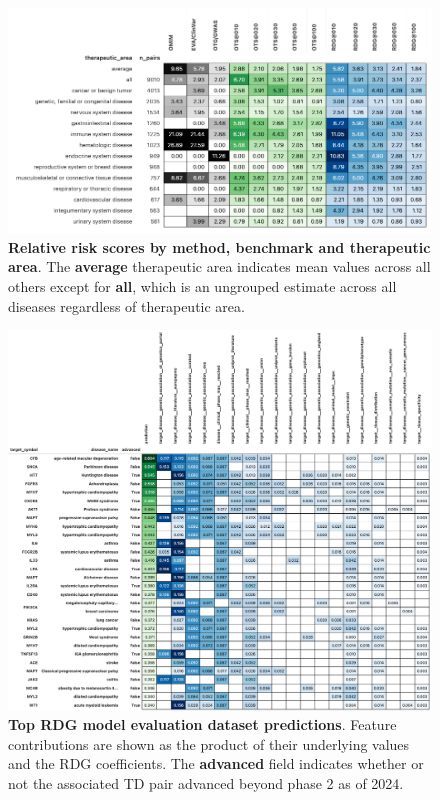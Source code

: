 \documentclass{article}
\begin{document}
\begin{figure}
  \centering
  \captionsetup{width=.9\linewidth}
  \includegraphics[width=1\textwidth]{relative_risk_by_ta.png}
  \caption{
    \textbf{Relative risk scores by method, benchmark and therapeutic area}.
    The \textbf{average} therapeutic area indicates mean values across all others except for \textbf{all}, which is an ungrouped estimate across all diseases regardless of therapeutic area.
  }
  \label{fig:relative_risk_by_ta}
\end{figure}


\begin{figure}
  \centering
  \captionsetup{width=.9\linewidth}
  \includegraphics[width=1\textwidth]{top_evaluation_predictions.png}
  \caption{
    \textbf{Top RDG model evaluation dataset predictions}.
    Feature contributions are shown as the product of their underlying values and the RDG coefficients. The \textbf{advanced} field indicates whether or not the associated TD pair advanced beyond phase 2 as of 2024.
  }
  \label{fig:top_evaluation_predictions}
\end{figure}
\end{document}
